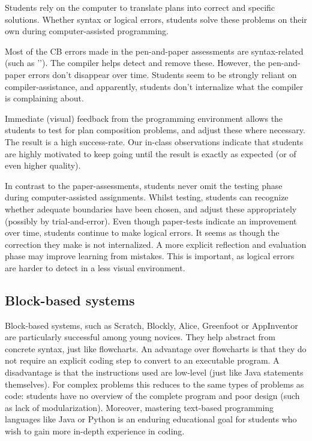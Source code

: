     Students rely on the computer to translate plans into correct and specific solutions. Whether syntax or logical errors, students solve these problems on their own during computer-assisted programming.

     \begin{description}[leftmargin=1em]

    \item[Syntax error detection:] Most of the CB errors made in
        the pen-and-paper assessments are syntax-related (such as
       '\jav{$=>$}'). The compiler helps detect and remove
        these. However, the pen-and-paper errors don't disappear over time.
        Students seem to be strongly reliant on compiler-assistance, and
        apparently, students don't internalize what the compiler is
        complaining about.


     \item[Evaluation:] Immediate (visual) feedback from the
         programming environment allows the students to test for plan
         composition problems, and adjust these where necessary. The result is a high success-rate.
         Our in-class observations indicate that students are highly motivated
         to keep going until the result is exactly as expected (or of even
         higher quality).



    In contrast to the paper-assessments, students never omit the testing
    phase during computer-assisted assignments. Whilst testing, students
    can recognize whether adequate boundaries have been chosen, and adjust
    these appropriately (possibly by trial-and-error). Even though
    paper-tests indicate an improvement over time, students continue to
    make logical errors. It seems as though the correction they make
     is not internalized. A more explicit reflection and evaluation phase
    may improve learning from mistakes. This is important, as logical errors are harder to detect in a less visual environment.



    \end{description}

\subsection*{Block-based systems}

Block-based systems, such as Scratch, Blockly, Alice, Greenfoot or
AppInventor are particularly successful among young novices. They help
abstract from concrete syntax, just like flowcharts. An advantage over
flowcharts is that they do not require an explicit coding step to convert to
an executable program. A disadvantage is that the instructions used are
low-level (just like Java statements themselves). For complex problems this
reduces to the same types of problems as code: students have no overview of
the complete program and poor design (such as lack of modularization).
Moreover, mastering text-based programming languages like Java or Python is
an enduring educational goal for students who wish to gain more in-depth
experience in coding.

